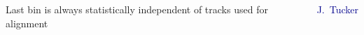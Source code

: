 \documentclass[compress]{beamer}
\begin{document}
\begin{frame}
\begin{columns}
\begin{minipage}{\linewidth}
\tiny Last bin is always statistically independent of tracks used for alignment
\end{minipage}

\vspace{2 cm}
\textcolor{darkblue}{\scriptsize J.~Tucker}
\end{columns}
\end{frame}
\end{document}
